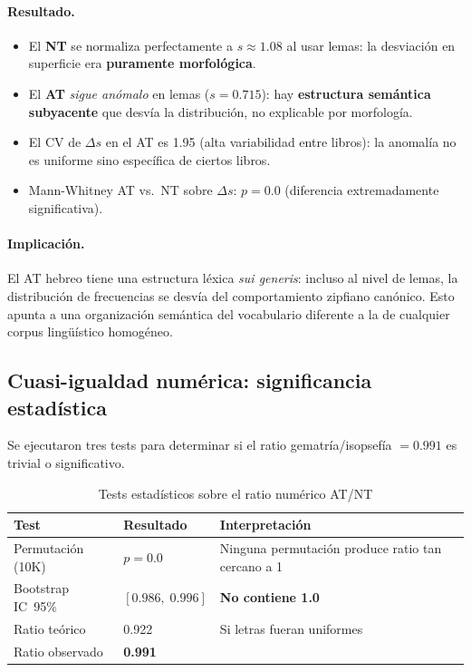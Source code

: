 \documentclass[12pt,a4paper]{article}
\newcommand{\ot}{\textcolor{otcolor}{\textbf{AT}}}
\newcommand{\nt}{\textcolor{ntcolor}{\textbf{NT}}}
\newcommand{\val}[1]{\textcolor{hlcolor}{\textbf{#1}}}
\begin{document}
\paragraph{Resultado.}
\begin{itemize}[leftmargin=2em]
\item El \nt{} se normaliza perfectamente a $s \approx 1.08$ al usar lemas:
      la desviaci\'on en superficie era \textbf{puramente morfol\'ogica}.
\item El \ot{} \emph{sigue an\'omalo} en lemas ($s = 0.715$): hay \textbf{estructura
      sem\'antica subyacente} que desv\'ia la distribuci\'on, no explicable por morfolog\'ia.
\item El CV de $\Delta s$ en el AT es 1.95 (alta variabilidad entre libros):
      la anomal\'ia no es uniforme sino espec\'ifica de ciertos libros.
\item Mann-Whitney AT vs.\ NT sobre $\Delta s$: $p = 0.0$ (diferencia extremadamente significativa).
\end{itemize}

\paragraph{Implicaci\'on.}
El AT hebreo tiene una estructura l\'exica \emph{sui generis}: incluso al nivel de lemas,
la distribuci\'on de frecuencias se desv\'ia del comportamiento zipfiano can\'onico.
Esto apunta a una organizaci\'on sem\'antica del vocabulario diferente a la de cualquier
corpus ling\"u\'istico homog\'eneo.

\subsection{Cuasi-igualdad num\'erica: significancia estad\'istica}

Se ejecutaron tres tests para determinar si el ratio gematr\'ia/isopsef\'ia $= 0.991$
es trivial o significativo.

\begin{table}[H]
\centering
\caption{Tests estad\'isticos sobre el ratio num\'erico AT/NT}
\label{tab:numtests}
\begin{tabular}{lll}
\toprule
\textbf{Test} & \textbf{Resultado} & \textbf{Interpretaci\'on} \\
\midrule
Permutaci\'on (10K) & $p = 0.0$ & Ninguna permutaci\'on produce ratio tan cercano a 1 \\
Bootstrap IC~95\% & $[0.986,\; 0.996]$ & \textbf{No contiene 1.0} \\
Ratio te\'orico  & 0.922 & Si letras fueran uniformes \\
Ratio observado  & \val{0.991} & \\
\bottomrule
\end{tabular}
\end{table}
\end{document}
